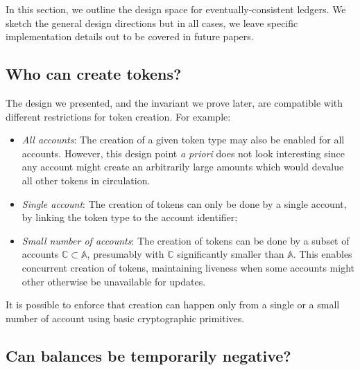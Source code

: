 \documentclass[9pt, oneside]{article}   	%
\begin{document}
In this section, we outline the design space for eventually-consistent ledgers. We sketch the general design directions but in all cases, we leave specific implementation details out to be covered in future papers.

\subsection{Who can create tokens?}

The design we presented, and the invariant we prove later, are compatible with different restrictions for token creation. For example:
\begin{itemize}
	\item \textit{All accounts}: The creation of a given token type may also be enabled for all accounts. However, this design point \textit{a priori} does not look interesting since any account might create an arbitrarily large amounts which would devalue all other tokens in circulation.
	\item \textit{Single account}: The creation of tokens can only be done by a single account, by linking the token type to the account identifier;
	\item \textit{Small number of accounts}: The creation of tokens can be done by a subset of accounts $\mathds{C} \subset \mathds{A}$, presumably with $\mathds{C}$ significantly smaller than $\mathds{A}$. This enables concurrent creation of tokens, maintaining liveness when some accounts might other otherwise be unavailable for updates.
\end{itemize}

It is possible to enforce that creation can happen only from a single or a small number of account using basic cryptographic primitives.


\subsection{Can balances be temporarily negative?}
\label{sec:design-neg-balance-choice}
\end{document}
